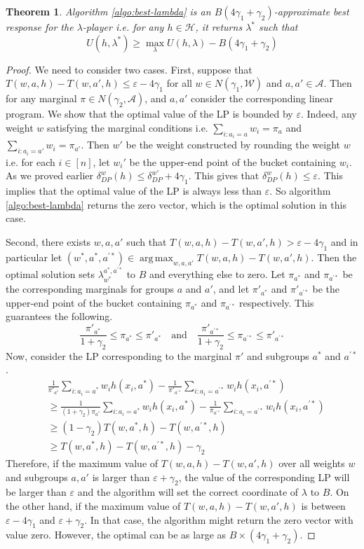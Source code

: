 \documentclass{article}
\newtheorem{theorem}{Theorem}
\DeclareMathOperator*{\argmax}{arg\,max}
\newcommand{\WW}{\mathcal{W}}
\newcommand{\Ac}{\mathcal{A}}
\newcommand{\HH}{\mathcal{H}}
\newcommand{\eps}{\varepsilon}
\begin{document}
\begin{theorem}
Algorithm \ref{algo:best-lambda} is an $B(4\gamma_1 + \gamma_2)$-approximate best response for the $\lambda$-player i.e. for any $h \in \HH$, it returns $\lambda^*$ such that
$$U(h,\lambda^*) \ge \max_{\lambda} U(h,\lambda) - B(4\gamma_1 + \gamma_2)$$
\end{theorem}
\begin{proof}
We need to consider two cases. First, suppose that $T(w,a,h) - T(w,a',h) \le \eps - 4\gamma_1$ for all $w \in N(\gamma_1,\WW)$ and $a,a' \in \Ac$. Then for any marginal $\pi \in N(\gamma_2,\Ac)$, and $a,a'$ consider the corresponding linear program. We show that the optimal value of the LP is bounded by $\eps$. Indeed, any weight $w$ satisfying the marginal conditions i.e. $\sum_{i:a_i = a}w_i = \pi_a$ and $\sum_{i:a_i = a'}w_i = \pi_{a'}$. Then $w'$ be the weight constructed by rounding the weight $w$ i.e. for each $i \in [n]$, let $w_i'$ be the upper-end point of the bucket containing $w_i$. As we proved earlier $\delta^w_{DP}(h) \le \delta^{w'}_{DP} + 4\gamma_1$. This gives that $\delta^w_{DP}(h) \le \eps$. This implies that the optimal value of the LP is always less than $\eps$. So algorithm \ref{algo:best-lambda} returns the zero vector, which is the optimal solution in this case.

Second, there exists $w,a,a'$ such that $T(w,a,h) - T(w,a',h) > \eps - 4\gamma_1$ and in particular let $(w^*,a^*,a^{'*}) \in \argmax_{w,a,a'} T(w,a,h) - T(w,a',h)$. Then the optimal solution sets $\lambda^{a^*,a^{'*}}_{w^*}$ to $B$ and everything else to zero. Let $\pi_{a^*}$ and $\pi_{a^{'*}}$ be the corresponding marginals for groups $a$ and $a'$, and let $\pi'_{a^*}$ and $\pi'_{a^{'*}}$ be the upper-end point of the bucket containing $\pi_{a^*}$ and $\pi_{a^{'*}}$ respectively. This guarantees the following.
$$ \frac{\pi'_{a^*}}{1 + \gamma_2} \le \pi_{a^*} \le \pi'_{a^*} \quad \text{and} \quad \frac{\pi'_{a^{'*}}}{1 + \gamma_2} \le \pi_{a^{'*}} \le \pi'_{a^{'*}} $$
Now, consider the LP corresponding to the marginal $\pi'$ and subgroups $a^*$ and $a^{'*}$. 
\begin{align*}
&\frac{1}{\pi'_{a^*}} \sum_{i:a_i = a^*} w_i h(x_i,a^*) - \frac{1}{\pi'_{a^{'*}}} \sum_{i:a_i = a^{'*}} w_i h(x_i,a^{'*}) \\
&\ge \frac{1}{(1+\gamma_2) \pi_{a^*}} \sum_{i:a_i = a^*} w_i h(x_i,a^*) - \frac{1}{\pi_{a^{'*}}} \sum_{i:a_i = a^{'*}} w_i h(x_i,a^{'*})  \\
&\ge (1-\gamma_2) T(w,a^*,h) - T(w,a^{'*},h)\\
&\ge T(w,a^*,h) - T(w,a^{'*},h) - \gamma_2
\end{align*}
Therefore, if the maximum value of $T(w,a,h) - T(w,a',h)$ over all weights $w$ and subgroups $a,a'$ is larger than $\eps + \gamma_2$, the value of the corresponding LP will be larger than $\eps$ and the algorithm will set the correct coordinate of $\lambda$ to $B$. On the other hand, if the maximum value of $T(w,a,h) - T(w,a',h)$ is between $\eps - 4\gamma_1$ and $\eps+\gamma_2$. In that case, the algorithm might return the zero vector with value zero. However, the optimal can be as large as $B \times (4\gamma_1 + \gamma_2)$.
\end{proof}
\end{document}
